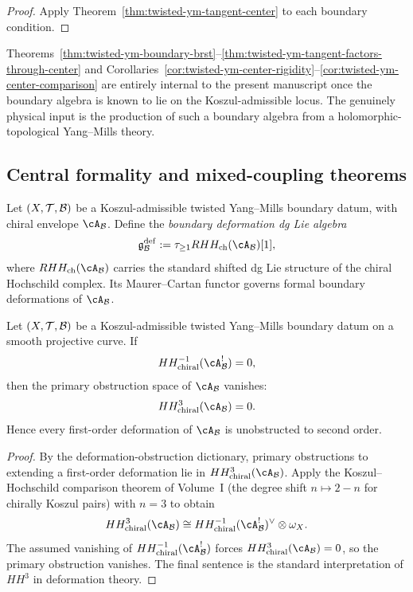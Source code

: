 \begin{proof}
Apply Theorem~\ref{thm:twisted-ym-tangent-center} to each boundary condition.
\end{proof}

\begin{remark}
\label{rem:twisted-ym-math-vs-physics}
Theorems~\ref{thm:twisted-ym-boundary-brst}--\ref{thm:twisted-ym-tangent-factors-through-center}
and Corollaries~\ref{cor:twisted-ym-center-rigidity}--\ref{cor:twisted-ym-center-comparison}
are entirely internal to the present manuscript once the boundary algebra is known to lie on
the Koszul-admissible locus. The genuinely physical input is the production of such a
boundary algebra from a holomorphic-topological Yang--Mills theory.
\end{remark}
\subsection{Central formality and mixed-coupling theorems}
\label{subsec:twisted-ym-central-formality}

\begin{definition}
\label{def:twisted-ym-def-dglie}
Let $(X,\mathcal{T},\mathcal{B})$ be a Koszul-admissible twisted Yang--Mills boundary datum, with chiral envelope $\cA_{\cB}$. Define the \emph{boundary deformation dg Lie algebra}
\[
\mathfrak{g}^{\mathrm{def}}_{\cB}
:=
\tau_{\ge 1} RHH_{\mathrm{ch}}(\cA_{\cB})[1],
\]
where $RHH_{\mathrm{ch}}(\cA_{\cB})$ carries the standard shifted dg Lie structure of the chiral Hochschild complex. Its Maurer--Cartan functor governs formal boundary deformations of $\cA_{\cB}$.
\end{definition}

\begin{theorem}
\label{thm:twisted-ym-dual-unobstructedness}
Let $(X,\mathcal{T},\mathcal{B})$ be a Koszul-admissible twisted Yang--Mills boundary datum on a smooth projective curve. If
\[
HH^{-1}_{\mathrm{chiral}}(\cA_{\cB}^{!}) = 0,
\]
then the primary obstruction space of $\cA_{\cB}$ vanishes:
\[
HH^{3}_{\mathrm{chiral}}(\cA_{\cB}) = 0.
\]
Hence every first-order deformation of $\cA_{\cB}$ is unobstructed to second order.
\end{theorem}

\begin{proof}
By the deformation-obstruction dictionary, primary obstructions to extending a first-order deformation lie in $HH^{3}_{\mathrm{chiral}}(\cA_{\cB})$. Apply the Koszul--Hochschild comparison theorem of Volume~I (the degree shift $n \mapsto 2-n$ for chirally Koszul pairs) with $n=3$ to obtain
\[
HH^{3}_{\mathrm{chiral}}(\cA_{\cB})
\cong
HH^{-1}_{\mathrm{chiral}}(\cA_{\cB}^{!})^{\vee}\otimes \omega_X.
\]
The assumed vanishing of $HH^{-1}_{\mathrm{chiral}}(\cA_{\cB}^{!})$ forces $HH^{3}_{\mathrm{chiral}}(\cA_{\cB})=0$, so the primary obstruction vanishes. The final sentence is the standard interpretation of $HH^3$ in deformation theory.
\end{proof}

